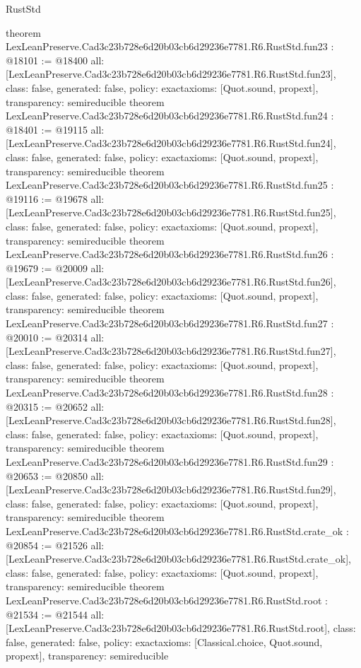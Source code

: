 \begin{lexlean}{RustStd}
\begin{coremodule}
{}
theorem LexLeanPreserve.Cad3c23b728e6d20b03cb6d29236e7781.R6.RustStd.fun23 : @18101 := @18400 {
  all: [LexLeanPreserve.Cad3c23b728e6d20b03cb6d29236e7781.R6.RustStd.fun23],
  class: false,
  generated: false,
  policy: exact{axioms: [Quot.sound, propext]},
  transparency: semireducible
}
theorem LexLeanPreserve.Cad3c23b728e6d20b03cb6d29236e7781.R6.RustStd.fun24 : @18401 := @19115 {
  all: [LexLeanPreserve.Cad3c23b728e6d20b03cb6d29236e7781.R6.RustStd.fun24],
  class: false,
  generated: false,
  policy: exact{axioms: [Quot.sound, propext]},
  transparency: semireducible
}
theorem LexLeanPreserve.Cad3c23b728e6d20b03cb6d29236e7781.R6.RustStd.fun25 : @19116 := @19678 {
  all: [LexLeanPreserve.Cad3c23b728e6d20b03cb6d29236e7781.R6.RustStd.fun25],
  class: false,
  generated: false,
  policy: exact{axioms: [Quot.sound, propext]},
  transparency: semireducible
}
theorem LexLeanPreserve.Cad3c23b728e6d20b03cb6d29236e7781.R6.RustStd.fun26 : @19679 := @20009 {
  all: [LexLeanPreserve.Cad3c23b728e6d20b03cb6d29236e7781.R6.RustStd.fun26],
  class: false,
  generated: false,
  policy: exact{axioms: [Quot.sound, propext]},
  transparency: semireducible
}
theorem LexLeanPreserve.Cad3c23b728e6d20b03cb6d29236e7781.R6.RustStd.fun27 : @20010 := @20314 {
  all: [LexLeanPreserve.Cad3c23b728e6d20b03cb6d29236e7781.R6.RustStd.fun27],
  class: false,
  generated: false,
  policy: exact{axioms: [Quot.sound, propext]},
  transparency: semireducible
}
theorem LexLeanPreserve.Cad3c23b728e6d20b03cb6d29236e7781.R6.RustStd.fun28 : @20315 := @20652 {
  all: [LexLeanPreserve.Cad3c23b728e6d20b03cb6d29236e7781.R6.RustStd.fun28],
  class: false,
  generated: false,
  policy: exact{axioms: [Quot.sound, propext]},
  transparency: semireducible
}
theorem LexLeanPreserve.Cad3c23b728e6d20b03cb6d29236e7781.R6.RustStd.fun29 : @20653 := @20850 {
  all: [LexLeanPreserve.Cad3c23b728e6d20b03cb6d29236e7781.R6.RustStd.fun29],
  class: false,
  generated: false,
  policy: exact{axioms: [Quot.sound, propext]},
  transparency: semireducible
}
theorem LexLeanPreserve.Cad3c23b728e6d20b03cb6d29236e7781.R6.RustStd.crate_ok : @20854 := @21526 {
  all: [LexLeanPreserve.Cad3c23b728e6d20b03cb6d29236e7781.R6.RustStd.crate_ok],
  class: false,
  generated: false,
  policy: exact{axioms: [Quot.sound, propext]},
  transparency: semireducible
}
theorem LexLeanPreserve.Cad3c23b728e6d20b03cb6d29236e7781.R6.RustStd.root : @21534 := @21544 {
  all: [LexLeanPreserve.Cad3c23b728e6d20b03cb6d29236e7781.R6.RustStd.root],
  class: false,
  generated: false,
  policy: exact{axioms: [Classical.choice, Quot.sound, propext]},
  transparency: semireducible
}


\end{coremodule}
\end{lexlean}
